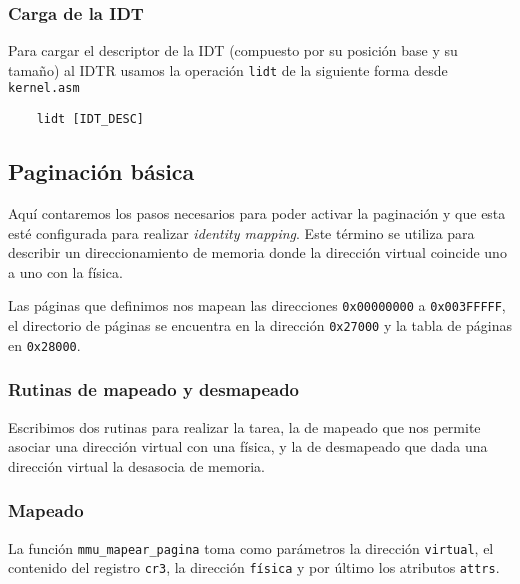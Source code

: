 \subsubsection{Carga de la IDT}
Para cargar el descriptor de la IDT (compuesto por su posición base y su tamaño) al IDTR usamos la operación \texttt{lidt} de la siguiente forma desde \texttt{kernel.asm}
\begin{lstlisting}
	lidt [IDT_DESC]
\end{lstlisting}

\subsection{Paginación básica}

Aquí contaremos los pasos necesarios para poder activar la paginación y que esta
esté configurada para realizar \textit{identity mapping}. Este término se
utiliza para describir un direccionamiento de memoria donde la dirección virtual
coincide uno a uno con la física.

Las páginas que definimos nos mapean las direcciones
\texttt{0x00000000} a \texttt{0x003FFFFF}, el directorio de páginas se encuentra
en la dirección \texttt{0x27000} y la tabla de páginas en \texttt{0x28000}.

\subsubsection{Rutinas de mapeado y desmapeado}

Escribimos dos rutinas para realizar la tarea, la de mapeado que nos permite
asociar una dirección virtual con una física, y la de desmapeado que dada una
dirección virtual la desasocia de memoria.

\subsubsection*{Mapeado}

La función \texttt{mmu\_mapear\_pagina} toma como parámetros la dirección \texttt{virtual}, el contenido del
registro \texttt{cr3}, la dirección \texttt{física} y por último los atributos
\texttt{attrs}.

